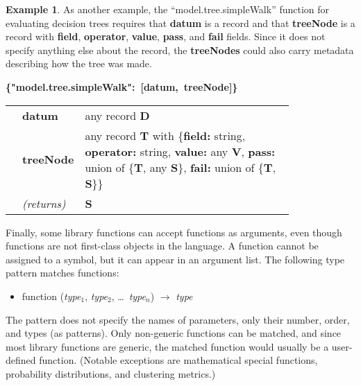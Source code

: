 \documentclass{article}
\newcommand{\PFAc}{\ttfamily\bfseries}
\newcommand{\PFAtp}{\ttfamily\bfseries}
\newcommand{\PFApf}{\ttfamily\bfseries}
\theoremstyle{definition}
\newtheorem{example}{Example}[section]
\begin{document}
\begin{example}
As another example, the ``model.tree.simpleWalk'' function for evaluating decision trees requires that {\PFAc datum} is a record and that {\PFAc treeNode} is a record with {\PFApf field}, {\PFApf operator}, {\PFApf value}, {\PFApf pass}, and {\PFApf fail} fields.  Since it does not specify anything else about the record, the {\PFAc treeNodes} could also carry metadata describing how the tree was made.
\begin{center}
\begin{minipage}{0.9\linewidth}
\mbox{\PFAc \{"model.tree.simpleWalk":$\!$ [datum, treeNode]\} \vspace{0.2 cm} \\} \vspace{0.2 cm} \\ \rm \begin{tabular}{p{0.01\linewidth} l p{0.8\linewidth}} & \PFAc datum \rm & any record {\PFAtp D} \\  & \PFAc treeNode \rm & any record {\PFAtp T} with \{{\PFApf field:}$\!$ string, {\PFApf operator:}$\!$ string, {\PFApf value:}$\!$ any {\PFAtp V}, {\PFApf pass:}$\!$ union of \{{\PFAtp T}, any {\PFAtp S}\}, {\PFApf fail:}$\!$ union of \{{\PFAtp T}, {\PFAtp S}\}\} \\  & {\it (returns)} & {\PFAtp S} \\ \end{tabular}
\end{minipage}
\end{center}
\end{example}

Finally, some library functions can accept functions as arguments, even though functions are not first-class objects in the language.  A function cannot be assigned to a symbol, but it can appear in an argument list.  The following type pattern matches functions:
\begin{itemize}
\item function ({\it type$_1$}, {\it type$_2$}, \ldots\ {\it type$_n$}) $\to$ {\it type}
\end{itemize}
The pattern does not specify the names of parameters, only their number, order, and types (as patterns).  Only non-generic functions can be matched, and since most library functions are generic, the matched function would usually be a user-defined function.  (Notable exceptions are mathematical special functions, probability distributions, and clustering metrics.)
\end{document}
